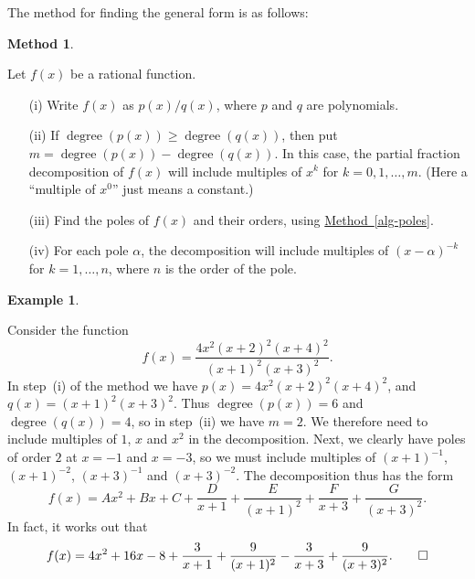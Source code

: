\documentclass[a4paper]{book}
\newcommand{\al}        {\alpha}
\newcommand{\degree}    {\operatorname{degree}}
\renewcommand{\:}{\colon}
\newcommand{\bilabel}[1]{\hypertarget{#1}{\label{#1}}}
\newcommand{\biref}[2]{\hyperlink{#2}{#1~\ref*{#2}}}
\theoremstyle{definition}
\newtheorem{example}[theorem]{Example}
\newtheorem{method}[theorem]{Method}
\begin{document}
The method for finding the general form is as follows:
\begin{method}\bilabel{alg-pfrac-form}
 Let $f(x)$ be a rational function.
 \begin{itemize}
  \item[(i)] Write $f(x)$ as $p(x)/q(x)$, where $p$ and $q$ are
   polynomials.
  \item[(ii)] If $\degree(p(x))\geq\degree(q(x))$, then put
   $m=\degree(p(x))-\degree(q(x))$.  In this case, the partial
   fraction decomposition of $f(x)$ will include multiples of $x^k$
   for $k=0,1,\dotsc,m$.  (Here a ``multiple of $x^0$'' just means a
   constant.) 
  \item[(iii)] Find the poles of $f(x)$ and their orders, using
   \biref{Method}{alg-poles}. 
  \item[(iv)] For each pole $\al$, the decomposition will include
   multiples of $(x-\al)^{-k}$ for $k=1,\dotsc,n$, where $n$ is the
   order of the pole.
 \end{itemize}
\end{method}
\begin{example}\bilabel{eg-pfrac-form-i}
 Consider the function
 \[ f(x) = \frac{4x^2(x+2)^2(x+4)^2}{(x+1)^2(x+3)^2}. \]
 In step~(i) of the method we have $p(x)=4x^2(x+2)^2(x+4)^2$, and
 $q(x)=(x+1)^2(x+3)^2$.  Thus $\degree(p(x))=6$ and $\degree(q(x))=4$,
 so in step~(ii) we have $m=2$.  We therefore need to include
 multiples of $1$, $x$ and $x^2$ in the decomposition.  Next, we
 clearly have poles of order $2$ at $x=-1$ and $x=-3$, so we must
 include multiples of $(x+1)^{-1}$, $(x+1)^{-2}$, $(x+3)^{-1}$ and
 $(x+3)^{-2}$.  The decomposition thus has the form
 \[ f(x) = Ax^2 + Bx + C +
           \frac{D}{x+1} + \frac{E}{(x+1)^2} + 
           \frac{F}{x+3} + \frac{G}{(x+3)^2}. 
 \]
 In fact, it works out that 
 \[ f(x) = 4x^2 + 16x - 8 +
           \frac{3}{x+1} + \frac{9}{(x+1)^2} - 
           \frac{3}{x+3} + \frac{9}{(x+3)^2}. \qed
 \]
\end{example}
\end{document}
